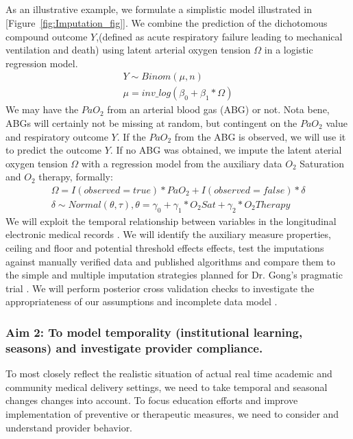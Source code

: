 \documentclass[11pt,notitlepage]{article}
\begin{document}
\subparagraph{}
As an illustrative example, we formulate a simplistic model illustrated in [Figure~\ref{fig:Imputation_fig}]. We combine the prediction of the dichotomous compound outcome $Y$,(defined as acute respiratory failure leading to mechanical ventilation and death) using latent arterial oxygen tension $\Omega$ in a logistic regression model. 
\begin{align}
Y \sim Binom(\mu, n) \\
\mu = inv\_log(\beta_{0} + \beta_{1} * \Omega)
\end{align} 
We may have the $PaO_{2}$ from an arterial blood gas (ABG) or not. Nota bene, ABGs will certainly not be missing at random, but contingent on the $PaO_2$ value and respiratory outcome $Y$. If the $PaO_{2}$ from the ABG is observed, we will use it to predict the outcome $Y$. If no ABG was obtained, we impute the latent aterial oxygen tension $\Omega$ with a regression model from the auxiliary data  $O_{2}$ Saturation and $O_{2}$ therapy, formally:
\begin{align}
\Omega =  I(observed = true) * PaO_{2}   +   I(observed = false) * \delta  \\ 
\delta \sim Normal(\theta, \tau), 
\theta = \gamma_{0} + \gamma_{1}* O_{2} Sat + \gamma_{2} * O_{2} Therapy
\end{align}
We will exploit the temporal relationship between variables in the longitudinal electronic medical records \cite{Welch24782349}. We will identify the auxiliary measure properties, ceiling and floor and potential threshold effects effects, test the imputations against manually verified data and published algorithms and compare them to the simple and multiple imputation strategies planned for Dr. Gong's pragmatic trial \cite{Huntington_16311133,Sloan_15027501}.  We will perform posterior cross validation checks to investigate the appropriateness of our assumptions and incomplete data model \cite{Gelman1998notasked}.

\subsubsection*{Aim 2: To model temporality (institutional learning, seasons) and investigate provider compliance.}
To most closely reflect the realistic situation of actual real time academic and community medical delivery settings, we need to take temporal and seasonal changes changes into account. To focus education efforts and improve implementation of preventive or therapeutic measures, we need to consider and understand provider behavior. 
\end{document}
